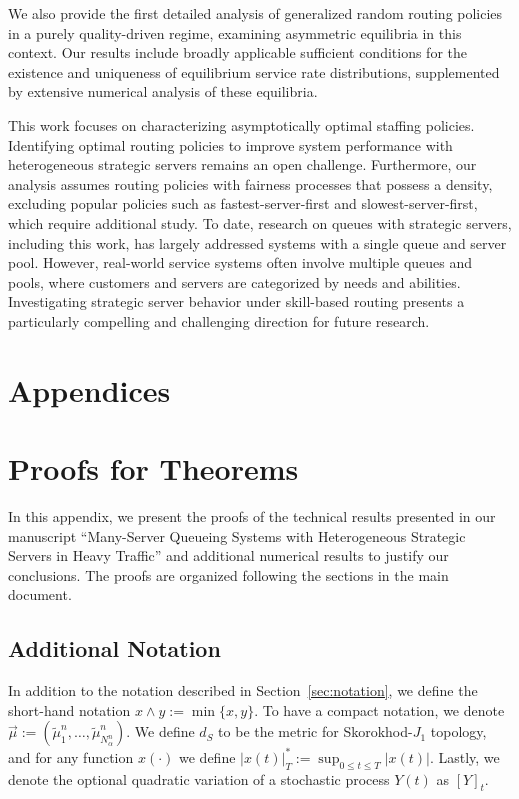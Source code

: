 \documentclass[a4paper,11pt,twoside]{article}
\numberwithin{equation}{section}
\numberwithin{figure}{section}
\theoremstyle{plain}
\newcommand{\1}{\mathbbm{1}}
\begin{document}
We also provide the first detailed analysis of generalized random routing policies in a purely quality-driven regime, examining asymmetric equilibria in this context. Our results include broadly applicable sufficient conditions for the existence and uniqueness of equilibrium service rate distributions, supplemented by extensive numerical analysis of these equilibria.

This work focuses on characterizing asymptotically optimal staffing policies. Identifying optimal routing policies to improve system performance with heterogeneous strategic servers remains an open challenge. Furthermore, our analysis assumes routing policies with fairness processes that possess a density, excluding popular policies such as fastest-server-first and slowest-server-first, which require additional study. To date, research on queues with strategic servers, including this work, has largely addressed systems with a single queue and server pool. However, real-world service systems often involve multiple queues and pools, where customers and servers are categorized by needs and abilities. Investigating strategic server behavior under skill-based routing presents a particularly compelling and challenging direction for future research.
 

\appendix
\section*{Appendices}
\section{Proofs for Theorems}

In this appendix, we present the proofs of the technical results presented in our manuscript  ``Many-Server Queueing Systems with Heterogeneous Strategic Servers in Heavy Traffic'' and additional numerical results to justify our conclusions. The proofs are organized following the sections in the main document. 


\subsection{Additional Notation}
In addition to the notation described in Section~\ref{sec:notation}, we define the short-hand notation $x\wedge y:=\min\{x,y\}$. To have a compact notation, we denote $\vec{\mu} := (\tilde{\mu}_1^n, \ldots, \tilde{\mu}_{N_\alpha^n}^n)$. We define $d_S$ to be the metric for Skorokhod-$J_1$ topology, and for any function $x(\cdot)$ we define $|x(t)|_T^*:=\sup_{0\leq t\leq T}|x(t)|$. 
Lastly, we denote the optional quadratic variation of a stochastic process $Y(t)$ as $[Y]_t$.
\end{document}
